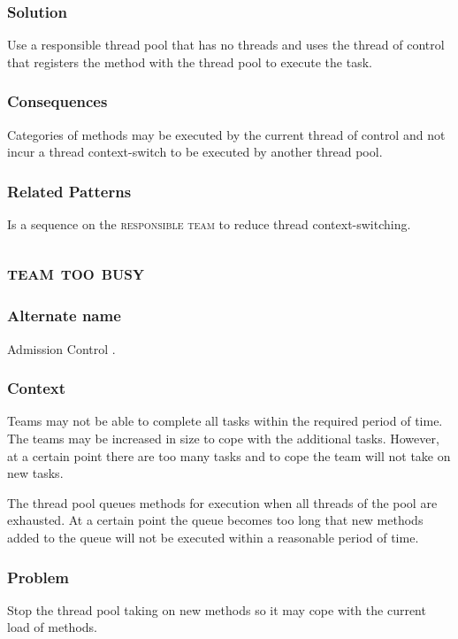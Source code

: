 \documentclass[prodmode]{style/acmlarge}
\begin{document}
\subsubsection*{Solution} Use a responsible thread pool that has no threads and
uses the thread of control that registers the method with the thread pool to
execute the task.

\subsubsection*{Consequences} Categories of methods may be executed by the
current thread of control and not incur a thread context-switch to be executed
by another thread pool.

\subsubsection*{Related Patterns} Is a sequence on the \textsc{responsible team}
to reduce thread context-switching.



\subsection{\textsc{\textbf{team too busy}}}

\subsubsection*{Alternate name} Admission Control \cite{seda}. 

\subsubsection*{Context} Teams may not be able to complete all tasks within the
required period of time.  The teams may be increased in size to cope with the
additional tasks.  However, at a certain point there are too many tasks and to
cope the team will not take on new tasks.

The thread pool queues methods for execution when all threads of the pool are
exhausted.  At a certain point the queue becomes too long that new methods added
to the queue will not be executed within a reasonable period of time.

\subsubsection*{Problem} Stop the thread pool taking on new methods so it may
cope with the current load of methods.
\end{document}
